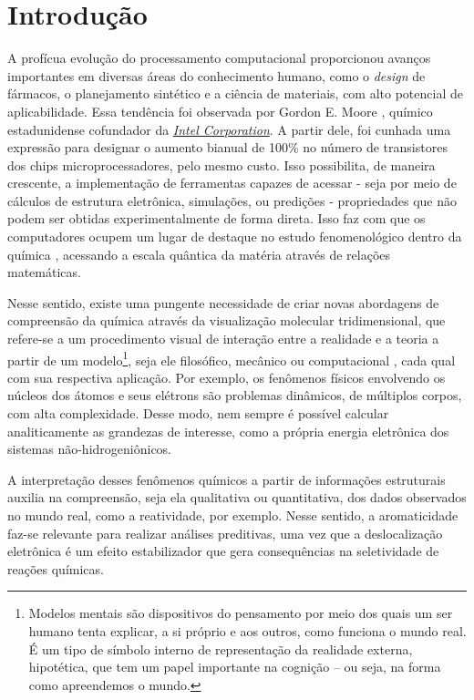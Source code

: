 \chapter{Introdução}

A profícua evolução do processamento computacional proporcionou avanços importantes em diversas áreas do conhecimento humano, como o \textit{design} de fármacos, o planejamento sintético e a ciência de materiais, com alto potencial de aplicabilidade. Essa tendência foi observada por Gordon E. Moore \autocite{Mack2011, Shalf2020}, químico estadunidense 
cofundador da \href{https://www.intel.com/content/www/us/en/company-overview/company-overview.html}{\textit{Intel Corporation}}. A partir dele, foi cunhada uma expressão para designar o aumento bianual de 100\% no número de transistores dos chips microprocessadores, pelo mesmo custo. Isso possibilita, de maneira crescente, a implementação de ferramentas capazes de acessar - seja por meio de cálculos de estrutura eletrônica, 
simulações, ou predições - propriedades que não podem ser obtidas experimentalmente de forma direta. Isso faz com que os computadores ocupem um lugar de destaque no estudo fenomenológico dentro da  química \autocite{Allouche2010, Rayan2017}, acessando a escala quântica da matéria através de relações matemáticas.

Nesse sentido, existe uma pungente necessidade de criar novas abordagens de compreensão da química através da visualização molecular tridimensional, que refere-se a um procedimento visual de interação entre a realidade e a teoria a partir de um modelo\footnote{Modelos mentais são dispositivos do pensamento por meio dos quais um ser humano tenta explicar, a si próprio e aos outros, como funciona o mundo real. É um tipo de símbolo interno de representação da realidade externa, hipotética, que tem um papel importante na cognição – ou seja, na forma como apreendemos o mundo.}, seja ele filosófico, mecânico ou computacional \autocite{Snyder2021}, cada qual com sua respectiva aplicação. Por exemplo, os fenômenos físicos envolvendo os núcleos dos átomos e seus elétrons são problemas dinâmicos, de múltiplos corpos, com alta complexidade. Desse modo, nem sempre é possível calcular analiticamente as grandezas de interesse, como a própria energia eletrônica dos sistemas não-hidrogeniônicos.

A interpretação desses fenômenos químicos a partir de informações estruturais auxilia na compreensão, seja ela qualitativa ou quantitativa, dos dados observados no mundo real, como a reatividade, por exemplo. Nesse sentido, a aromaticidade faz-se relevante para realizar análises preditivas, uma vez que a deslocalização eletrônica é um efeito estabilizador que gera consequências na seletividade de reações químicas.

